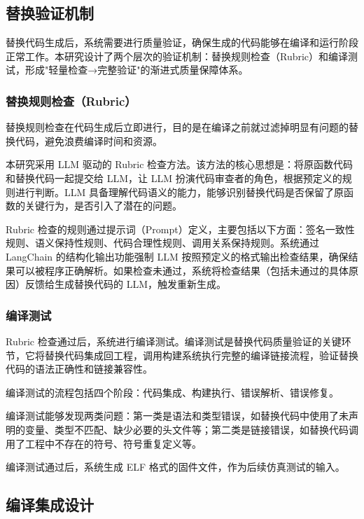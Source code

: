 \subsection{替换验证机制}

替换代码生成后，系统需要进行质量验证，确保生成的代码能够在编译和运行阶段正常工作。本研究设计了两个层次的验证机制：替换规则检查（Rubric）和编译测试，形成"轻量检查→完整验证"的渐进式质量保障体系。

\subsubsection{替换规则检查（Rubric）}

替换规则检查在代码生成后立即进行，目的是在编译之前就过滤掉明显有问题的替换代码，避免浪费编译时间和资源。

本研究采用 LLM 驱动的 Rubric 检查方法。该方法的核心思想是：将原函数代码和替换代码一起提交给 LLM，让 LLM 扮演代码审查者的角色，根据预定义的规则进行判断。LLM 具备理解代码语义的能力，能够识别替换代码是否保留了原函数的关键行为，是否引入了潜在的问题。

Rubric 检查的规则通过提示词（Prompt）定义，主要包括以下方面：签名一致性规则、语义保持性规则、代码合理性规则、调用关系保持规则。系统通过 LangChain 的结构化输出功能强制 LLM 按照预定义的格式输出检查结果，确保结果可以被程序正确解析。如果检查未通过，系统将检查结果（包括未通过的具体原因）反馈给生成替换代码的 LLM，触发重新生成。

\subsubsection{编译测试}

Rubric 检查通过后，系统进行编译测试。编译测试是替换代码质量验证的关键环节，它将替换代码集成回工程，调用构建系统执行完整的编译链接流程，验证替换代码的语法正确性和链接兼容性。

编译测试的流程包括四个阶段：代码集成、构建执行、错误解析、错误修复。

编译测试能够发现两类问题：第一类是语法和类型错误，如替换代码中使用了未声明的变量、类型不匹配、缺少必要的头文件等；第二类是链接错误，如替换代码调用了工程中不存在的符号、符号重复定义等。

编译测试通过后，系统生成 ELF 格式的固件文件，作为后续仿真测试的输入。

\subsection{编译集成设计}

